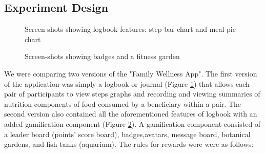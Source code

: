 \documentclass{sig-alternate}
\begin{document}
\subsection{Experiment Design}
\begin{figure}
\centering
{}
\caption{Screen-shots showing logbook features: step bar chart and meal pie chart}
\label{figure:logbookapp}
\end{figure}
\begin{figure}
\centering
{}
\caption{Screen-shots showing badges and a fitness garden}
\label{figure:gameapp}
\end{figure}
We were comparing two versions of the "Family Wellness App". The first version of the application was simply a logbook or journal (Figure \ref{figure:logbookapp}) that allows each pair of participants to view steps graphs and recording and viewing summaries of nutrition components of food consumed by a beneficiary within a pair. The second version also contained all the aforementioned features of logbook with an added gamification component (Figure \ref{figure:gameapp}). A gamification component consisted of a leader board (points' score board), badges,avatars, message board, botanical gardens, and fish tanks (aquarium). The rules for rewards were were as follows:
\end{document}
